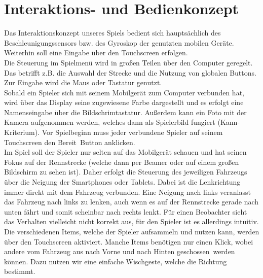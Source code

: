 \section{Interaktions- und Bedienkonzept}

Das Interaktionskonzept unseres Spiels bedient sich hauptsächlich des Beschleunigungssensors bzw. des Gyroskop der genutzten mobilen Geräte. Weiterhin soll eine Eingabe über den Touchscreen erfolgen.\\
Die Steuerung im Spielmenü wird in großen Teilen über den Computer geregelt. Das betrifft z.B. die Auswahl der Strecke und die Nutzung von globalen Buttons. Zur Eingabe wird die Maus oder Tastatur genutzt.\\
Sobald ein Spieler sich mit seinem Mobilgerät zum Computer verbunden hat, wird über das Display seine zugewiesene Farbe dargestellt und es erfolgt eine Namenseingabe über die Bildschrimtastatur. Außerdem kann ein Foto mit der Kamera aufgenommen werden, welches dann als Spielerbild fungiert (Kann-Kriterium). Vor Spielbeginn muss jeder verbundene Spieler auf seinem Touchscreen den \glqq Bereit\grqq\ Button anklicken.\\
Im Spiel soll der Spieler nur selten auf das Mobilgerät schauen und hat seinen Fokus auf der Rennstrecke (welche dann per Beamer oder auf einem großen Bildschirm zu sehen ist). Daher erfolgt die Steuerung des jeweiligen Fahrzeugs über die Neigung der Smartphones oder Tablets. Dabei ist die Lenkrichtung immer direkt mit dem Fahrzeug verbunden. Eine Neigung nach links veranlasst das Fahrzeug nach links zu lenken, auch wenn es auf der Rennstrecke gerade nach unten fährt und somit scheinbar nach rechts lenkt. Für einen Beobachter sieht das Verhalten vielleicht nicht korrekt aus, für den Spieler ist es allerdings intuitiv.\\
Die verschiedenen Items, welche der Spieler aufsammeln und nutzen kann, werden über den Touchscreen aktiviert. Manche Items benötigen nur einen Klick, wobei andere vom Fahrzeug aus nach Vorne und nach Hinten \glqq geschossen\grqq\ werden können. Dazu nutzen wir eine einfache Wischgeste, welche die Richtung bestimmt.
